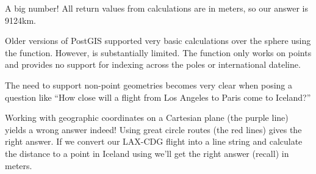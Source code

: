 \documentclass[a4paper,11pt,english]{sphinxmanual}
\begin{document}
\begin{sphinxVerbatim}[commandchars=\\\{\}]
 
   
       
\end{sphinxVerbatim}

\begin{sphinxVerbatim}[commandchars=\\\{\}]
\end{sphinxVerbatim}

A big number! All return values from  calculations are in meters, so our answer is 9124km.

Older versions of PostGIS supported very basic calculations over the sphere using the  function. However,  is substantially limited. The function only works on points and provides no support for indexing across the poles or international dateline.

The need to support non-point geometries becomes very clear when posing a question like “How close will a flight from Los Angeles to Paris come to Iceland?”

\noindent{}

Working with geographic coordinates on a Cartesian plane (the purple line) yields a  wrong answer indeed! Using great circle routes (the red lines) gives the right answer. If we convert our LAX-CDG flight into a line string and calculate the distance to a point in Iceland using  we’ll get the right answer (recall) in meters.

\begin{sphinxVerbatim}[commandchars=\\\{\}]
 
   
                          
\end{sphinxVerbatim}
\end{document}
